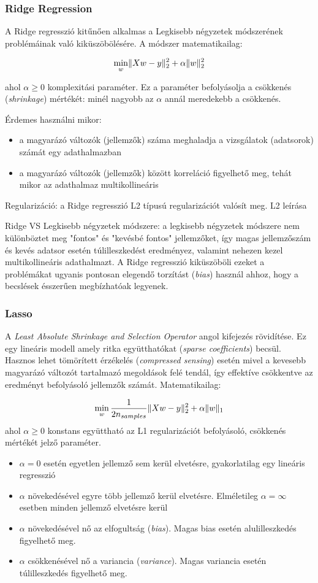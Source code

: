 \subsubsection{Ridge Regression}
A Ridge regresszió kitűnően alkalmas a Legkisebb négyzetek módszerének problémáinak való kiküszöbölésére. 
A módszer matematikailag:

$$ \min_{w} \lVert Xw-y\rVert_2^2 + \alpha \lVert w\rVert_2^2$$ 

ahol $\alpha \geq 0$ komplexitási paraméter. Ez a paraméter befolyásolja a csökkenés (\textit{shrinkage}) mértékét: minél nagyobb az $\alpha$ annál meredekebb a csökkenés. 

Érdemes használni mikor:
\begin{itemize}
	\item a magyarázó változók (jellemzők) száma meghaladja a vizsgálatok (adatsorok) számát egy adathalmazban
	\item a magyarázó változók (jellemzők) között korreláció figyelhető meg, tehát mikor az adathalmaz multikollineáris
\end{itemize}

Regularizáció: a Ridge regresszió L2 típusú regularizációt valósít meg. \TODO L2 leírása


Ridge VS Legkisebb négyzetek módszere: a legkisebb négyzetek módszere nem különböztet meg "fontos" és "kevésbé fontos" jellemzőket, így magas jellemzőszám és kevés adatsor esetén túlilleszkedést eredményez, valamint nehezen kezel multikollineáris adathalmazt. A Ridge regresszió kiküszöböli ezeket a problémákat ugyanis pontosan elegendő torzítást (\textit{bias}) használ ahhoz, hogy a becslések ésszerűen megbízhatóak legyenek.



\subsubsection{Lasso}
A \textit{Least Absolute Shrinkage and Selection Operator} angol kifejezés rövidítése. Ez egy lineáris modell amely ritka együtthatókat (\textit{sparse coefficients}) becsül. Hasznos lehet tömörített érzékelés (\textit{compressed sensing}) esetén mivel a kevesebb magyarázó változót tartalmazó megoldások felé tendál, így effektíve csökkentve az eredményt befolyásoló jellemzők számát. Matematikailag:

$$ \min_{w}\frac{1}{2n_{samples}} \lVert Xw-y\rVert_2^2 + \alpha \lVert w\rVert_1$$
ahol $\alpha \geq 0$ konstans együttható az L1 regularizációt befolyásoló, csökkenés mértékét jelző paraméter. 
\begin{itemize}
	\item $\alpha = 0$ esetén egyetlen jellemző sem kerül elvetésre, gyakorlatilag egy lineáris regresszió
	\item $\alpha$ növekedésével egyre több jellemző kerül elvetésre. Elméletileg $\alpha = \infty$ esetben minden jellemző elvetésre kerül
	\item $\alpha$ növekedésével nő az elfogultság (\textit{bias}). Magas bias esetén alulilleszkedés figyelhető meg.
	\item $\alpha$ csökkenésével nő a variancia (\textit{variance}). Magas variancia esetén túlilleszkedés figyelhető meg.
\end{itemize}

